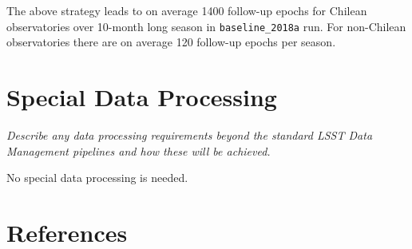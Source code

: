 \documentclass[12pt,letterpaper]{article}
\begin{document}
The above strategy leads to on average 1400 follow-up epochs for 
Chilean observatories over 10-month long season in {\tt baseline\_2018a} run. 
For non-Chilean observatories there are on average 120 follow-up 
epochs per season.  

\vspace{.6in}

\section{Special Data Processing}
\begin{footnotesize}
{\it Describe any data processing requirements beyond the standard LSST Data Management pipelines and how these will be achieved.}
\end{footnotesize}

No special data processing is needed. %



\section{References}
\end{document}
